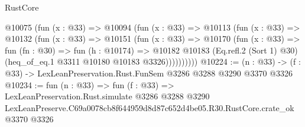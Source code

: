 \begin{lexlean}{RustCore}
\begin{coremodule}
        @10075
          (fun (x : @33) =>
          @10094
            (fun (x : @33) =>
            @10113
              (fun (x : @33) =>
              @10132
                (fun (x : @33) =>
                @10151
                  (fun (x : @33) =>
                  @10170
                    (fun (x : @33) =>
                    fun (fn : @30) =>
                    fun (h : @10174) =>
                    @10182
                      @10183
                      (Eq.refl.{2} (Sort 1) @30)
                      (heq_of_eq.{1} @3311 @10180 @10183 @3326))))))))))
@10224 := (n : @33) -> (f : @33) -> LexLeanPreservation.Rust.FunSem @3286 @3288 @3290 @3370 @3326
@10234 := fun (n : @33) =>
  fun (f : @33) =>
  LexLeanPreservation.Rust.simulate
    @3286
    @3288
    @3290
    LexLeanPreserve.C69a0078cb8f644959d8d87c652d4be05.R30.RustCore.crate_ok
    @3370
    @3326
\end{coremodule}
\end{lexlean}
